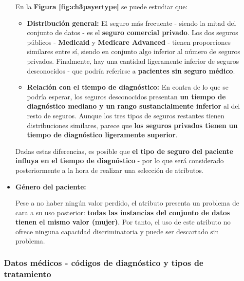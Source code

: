 \begin{itemize}[leftmargin=*]
	En la \textbf{Figura \ref{fig:ch3payertype}} se puede estudiar que:
	\begin{itemize}
		\item \textbf{Distribución general:} El seguro más frecuente - siendo la mitad del conjunto de datos - es el \textbf{seguro comercial privado}. Los dos seguros públicos - \textbf{Medicaid} y \textbf{Medicare Advanced} - tienen proporciones similares entre sí, siendo en conjunto algo inferior al número de seguros privados. Finalmente, hay una cantidad ligeramente inferior de seguros desconocidos - que podría referirse a \textbf{pacientes sin seguro médico}.
		\item \textbf{Relación con el tiempo de diagnóstico:} En contra de lo que se podría esperar, los seguros desconocidos presentan \textbf{un tiempo de diagnóstico mediano y un rango sustancialmente inferior} al del resto de seguros. Aunque los tres tipos de seguros restantes tienen distribuciones similares, parece que \textbf{los seguros privados tienen un tiempo de diagnóstico ligeramente superior}.
	\end{itemize}
	
	Dadas estas diferencias, es posible que \textbf{el tipo de seguro del paciente influya en el tiempo de diagnóstico} - por lo que será considerado posteriormente a la hora de realizar una selección de atributos.
	
	\item \textbf{Género del paciente:}
	
	Pese a no haber ningún valor perdido, el atributo presenta un problema de cara a su uso posterior: \textbf{todas las instancias del conjunto de datos tienen el mismo valor (mujer)}. Por tanto, el uso de este atributo no ofrece ninguna capacidad discriminatoria y puede ser descartado sin problema.
	
\end{itemize}

\newpage

\subsubsection{Datos médicos - códigos de diagnóstico y tipos de tratamiento}

